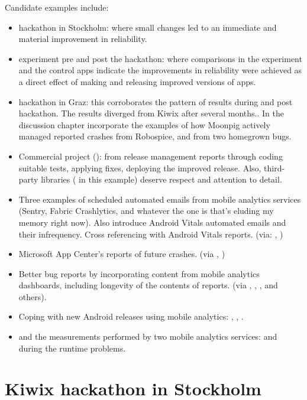 Candidate examples include:
\begin{itemize}
    \item {} hackathon in Stockholm: where small changes led to an immediate and material improvement in reliability. 
    \item {} experiment pre and post the hackathon: where comparisons in the experiment and the control apps indicate the improvements in reliability were achieved as a direct effect of making and releasing improved versions of apps.
    \item {} hackathon in Graz: this corroborates the pattern of results during and post hackathon. The results diverged from Kiwix after several months.. In the discussion chapter incorporate the examples of how Moonpig actively managed reported crashes from Robospice, and from two homegrown bugs.
    \item Commercial project (): from release management reports through coding suitable tests, applying fixes, deploying the improved release. Also, third-party libraries ( in this example) deserve respect and attention to detail.
    \item Three examples of scheduled automated emails from mobile analytics services (Sentry, Fabric Crashlytics, and whatever the one is that's eluding my memory right now). Also introduce Android Vitals automated emails and their infrequency. Cross referencing with Android Vitals reports. (via: , )
    \item Microsoft App Center's reports of future crashes. (via , )
    \item Better bug reports by incorporating content from mobile analytics dashboards, including longevity of the contents of reports. (via , , , and others).
    \item Coping with new Android releases using mobile analytics: , , .
    \item {}  and the measurements performed by two mobile analytics services:  and  during the runtime problems.
\end{itemize}

\section{Kiwix hackathon in Stockholm}

\section{}